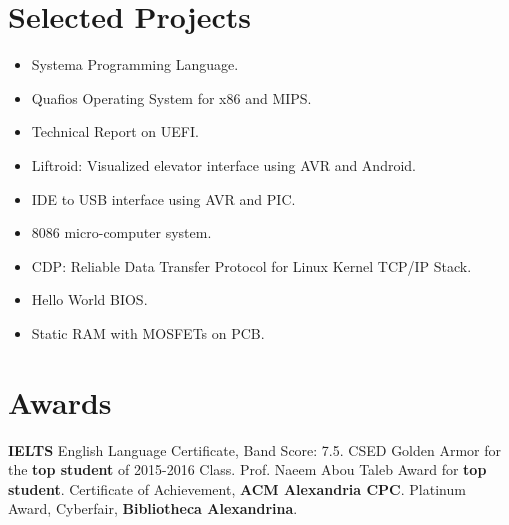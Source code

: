 \documentclass[letterpaper]{twentysecondcv} %
\begin{document}

\section{Selected Projects}

\begin{itemize}
    \item{Systema Programming Language.}
    \item{Quafios Operating System for x86 and MIPS.}
    \item{Technical Report on UEFI.}
    \item{Liftroid: Visualized elevator interface using AVR and Android.}
    \item{IDE to USB interface using AVR and PIC.}
    \item{8086 micro-computer system.}
    \item{CDP: Reliable Data Transfer Protocol for Linux Kernel TCP/IP Stack.}
    \item{Hello World BIOS.}
    \item{Static RAM with MOSFETs on PCB.}
\end{itemize}


\section{Awards}

\begin{twentyshort}
	       {\textbf{IELTS} English Language Certificate, Band Score: 7.5.}
	       {CSED Golden Armor for the \textbf{top student} of 2015-2016 Class.}
	       {Prof. Naeem Abou Taleb Award for \textbf{top student}.}
	       {Certificate of Achievement, \textbf{ACM Alexandria CPC}.}
	       {Platinum Award, Cyberfair, \textbf{Bibliotheca Alexandrina}.}
\end{twentyshort}
\end{document}
